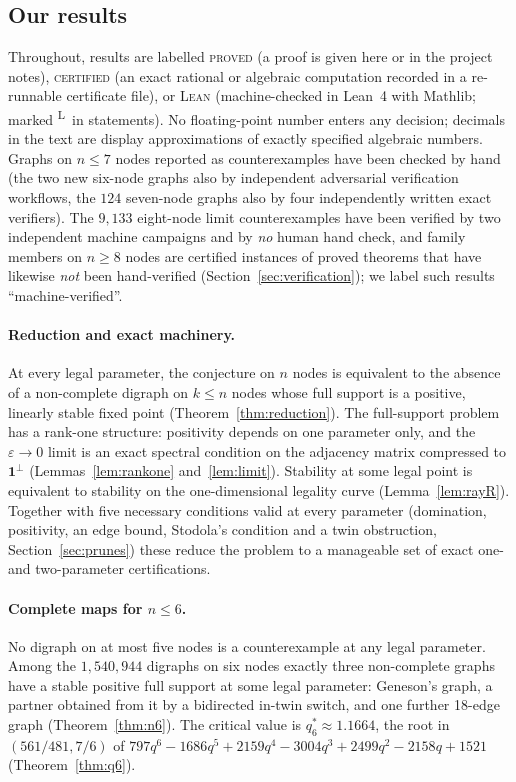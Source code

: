 \documentclass[11pt]{article}
\theoremstyle{definition}
\newcommand{\one}{\mathbf{1}}
\newcommand{\eps}{\varepsilon}
\newcommand{\lean}{\textsuperscript{\textsf{L}}}
\newcommand{\st}[1]{\textsc{#1}}
\begin{document}
\subsection{Our results}
Throughout, results are labelled \st{proved} (a proof is given here or in the project notes),
\st{certified} (an exact rational or algebraic computation recorded in a re-runnable certificate file),
or \st{Lean} (machine-checked in Lean~4 with Mathlib; marked \lean\ in statements). No floating-point
number enters any decision; decimals in the text are display approximations of exactly specified
algebraic numbers. Graphs on $n\le7$ nodes reported as counterexamples have been checked by hand (the two new
six-node graphs also by independent adversarial verification workflows, the $124$ seven-node graphs also by
four independently written exact verifiers). The $9{,}133$ eight-node limit counterexamples have been verified by two
independent machine campaigns and by \emph{no} human hand check, and family members on $n\ge8$ nodes are certified
instances of proved theorems that have likewise \emph{not} been hand-verified (Section~\ref{sec:verification}); we label
such results ``machine-verified''.

\paragraph{Reduction and exact machinery.} At every legal parameter, the conjecture on $n$ nodes is
equivalent to the absence of a non-complete digraph on $k\le n$ nodes whose full support is a positive,
linearly stable fixed point (Theorem~\ref{thm:reduction}). The full-support problem has a rank-one
structure: positivity depends on one parameter only, and the $\eps\to0$ limit is an exact spectral
condition on the adjacency matrix compressed to $\one^\perp$ (Lemmas~\ref{lem:rankone}
and~\ref{lem:limit}). Stability at some legal point is equivalent to stability on the one-dimensional
legality curve (Lemma~\ref{lem:rayR}). Together with five necessary conditions valid at every parameter
(domination, positivity, an edge bound, Stodola's condition and a twin obstruction, Section~\ref{sec:prunes})
these reduce the problem to a manageable set of exact one- and two-parameter certifications.

\paragraph{Complete maps for $n\le6$.} No digraph on at most five nodes is a counterexample at any legal
parameter. Among the $1{,}540{,}944$ digraphs on six nodes exactly three non-complete graphs have a
stable positive full support at some legal parameter: Geneson's graph, a partner obtained from it by a
bidirected in-twin switch, and one further 18-edge graph (Theorem~\ref{thm:n6}). The critical value is
$q_6^*\approx1.1664$, the root in $(561/481,7/6)$ of
$797q^6-1686q^5+2159q^4-3004q^3+2499q^2-2158q+1521$ (Theorem~\ref{thm:q6}).
\end{document}
